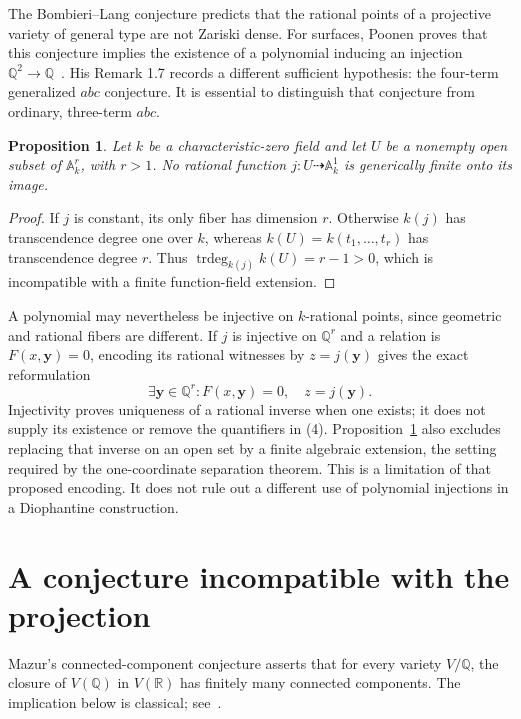 \documentclass[11pt,a4paper]{article}
\newtheorem{proposition}[theorem]{Proposition}
\newcommand{\Q}{\mathbb Q}\newcommand{\Z}{\mathbb Z}
\newcommand{\A}{\mathbb A}\newcommand{\PP}{\mathbb P}
\begin{document}
The Bombieri--Lang conjecture predicts that the rational points
of a projective variety of general type are not Zariski dense.
For surfaces, Poonen proves that this conjecture implies the
existence of a polynomial inducing an injection
$\Q^2\to\Q$~\cite[Theorem 1.1]{Poonen}.
His Remark 1.7 records a different sufficient hypothesis:
the four-term generalized $abc$ conjecture.
It is essential to distinguish that conjecture from ordinary,
three-term $abc$.

\begin{proposition}\label{prop:dimension}
Let $k$ be a characteristic-zero field and let $U$ be a nonempty
open subset of $\A^r_k$, with $r>1$.
No rational function $j:U\dashrightarrow\A^1_k$ is generically
finite onto its image.
\end{proposition}
\begin{proof}
If $j$ is constant, its only fiber has dimension $r$.
Otherwise $k(j)$ has transcendence degree one over $k$, whereas
$k(U)=k(t_1,\ldots,t_r)$ has transcendence degree $r$.
Thus
$\operatorname{trdeg}_{k(j)}k(U)=r-1>0$,
which is incompatible with a finite function-field extension.
\end{proof}

A polynomial may nevertheless be injective on $k$-rational
points, since geometric and rational fibers are different.
If $j$ is injective on $\Q^r$ and a relation is
$F(x,\mathbf y)=0$, encoding its rational witnesses by
$z=j(\mathbf y)$ gives the exact reformulation
\[
 \exists\mathbf y\in\Q^r:
   F(x,\mathbf y)=0,\quad z=j(\mathbf y).
 \tag{4}
\]
Injectivity proves uniqueness of a rational inverse when one
exists; it does not supply its existence or remove the
quantifiers in (4).
Proposition~\ref{prop:dimension} also excludes replacing that
inverse on an open set by a finite algebraic extension, the
setting required by the one-coordinate separation theorem.
This is a limitation of that proposed encoding. It does not
rule out a different use of polynomial injections in a
Diophantine construction.

\section{A conjecture incompatible with the projection}

Mazur's connected-component conjecture asserts that for every
variety $V/\Q$, the closure of $V(\Q)$ in $V(\mathbb R)$ has
finitely many connected components. The implication below is
classical; see~\cite[\S\S 2--3]{CornelissenZahidi}.
\end{document}
